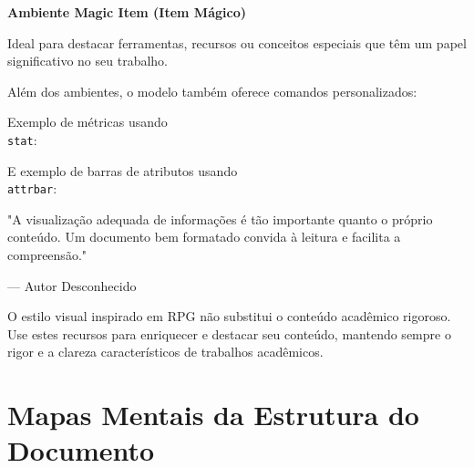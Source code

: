 \begin{magicitem}
\textbf{Ambiente Magic Item (Item Mágico)}

Ideal para destacar ferramentas, recursos ou conceitos especiais que têm um papel significativo no seu trabalho.
\end{magicitem}


Além dos ambientes, o modelo também oferece comandos personalizados:

\begin{itemize}
\end{itemize}

Exemplo de métricas usando \texttt{\\stat}:

  

E exemplo de barras de atributos usando \texttt{\\attrbar}:


\begin{quotebox}
"A visualização adequada de informações é tão importante quanto o próprio conteúdo. Um documento bem formatado convida à leitura e facilita a compreensão."

— Autor Desconhecido
\end{quotebox}

\begin{highlight}
O estilo visual inspirado em RPG não substitui o conteúdo acadêmico rigoroso. Use estes recursos para enriquecer e destacar seu conteúdo, mantendo sempre o rigor e a clareza característicos de trabalhos acadêmicos.
\end{highlight}

\section{Mapas Mentais da Estrutura do Documento}

